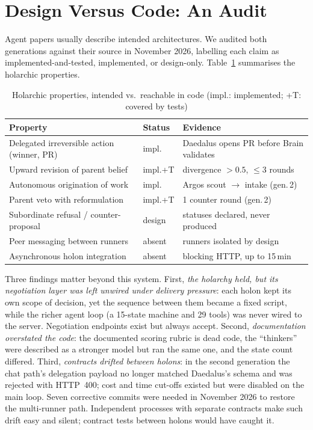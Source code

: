 \documentclass[conference]{IEEEtran}
\begin{document}
\section{Design Versus Code: An Audit}
\label{sec:audit}

Agent papers usually describe intended architectures. We audited both
generations against their source in November 2026, labelling each claim as
implemented-and-tested, implemented, or design-only. Table~\ref{tab:audit}
summarises the holarchic properties.

\begin{table}[t]
\caption{Holarchic properties, intended vs.\ reachable in code (impl.: implemented; +T: covered by tests)}
\label{tab:audit}
\centering
\footnotesize
\setlength{\tabcolsep}{3pt}
\begin{tabular}{@{}p{3.3cm}p{1.25cm}p{3.6cm}@{}}
\toprule
Property & Status & Evidence \\
\midrule
Delegated irreversible action (winner, PR) & impl. & Daedalus opens PR before Brain validates \\
Upward revision of parent belief & impl.+T & divergence $>0.5$, $\le$3 rounds \\
Autonomous origination of work & impl. & Argos scout $\rightarrow$ intake (gen.\,2) \\
Parent veto with reformulation & impl.+T & 1 counter round (gen.\,2) \\
Subordinate refusal / counter-proposal & design & statuses declared, never produced \\
Peer messaging between runners & absent & runners isolated by design \\
Asynchronous holon integration & absent & blocking HTTP, up to 15\,min \\
\bottomrule
\end{tabular}
\end{table}

Three findings matter beyond this system. First, \emph{the holarchy held,
but its negotiation layer was left unwired under delivery pressure}: each
holon kept its own scope of decision, yet the sequence between them became a
fixed script, while the richer agent loop (a 15-state machine and 29 tools)
was never wired to the server. Negotiation endpoints exist but always
accept. Second, \emph{documentation overstated the code}: the
documented scoring rubric is dead code, the ``thinkers'' were described as a
stronger model but ran the same one, and the state count differed. Third,
\emph{contracts drifted between holons}: in the second generation the chat
path's delegation payload no longer matched Daedalus's schema and was
rejected with HTTP~400; cost and time cut-offs existed but were disabled on
the main loop. Seven corrective commits were needed in November 2026 to
restore the multi-runner path. Independent processes with separate
contracts make such drift easy and silent; contract tests between holons
would have caught it.
\end{document}
